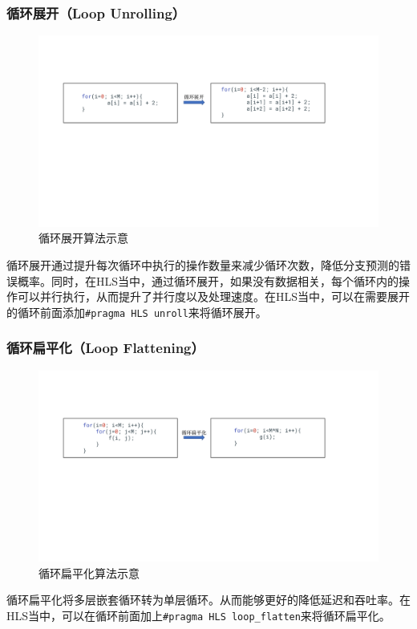 \subsubsection{循环展开（Loop Unrolling）}
\begin{figure}[htbp]
    \centering
    \includegraphics[width=\linewidth]{figures/loop unrolling.pdf}
    \caption{循环展开算法示意}
    \label{fig:loop_unrolling}
\end{figure}
循环展开通过提升每次循环中执行的操作数量来减少循环次数，降低分支预测的错误概率。同时，在HLS当中，通过循环展开，如果没有数据相关，每个循环内的操作可以并行执行，从而提升了并行度以及处理速度。在HLS当中，可以在需要展开的循环前面添加\verb|#pragma HLS unroll|来将循环展开。

\subsubsection{循环扁平化（Loop Flattening）}
\begin{figure}[htbp]
    \centering
    \includegraphics[width=\linewidth]{figures/loop flattening.pdf}
    \caption{循环扁平化算法示意}
    \label{fig:loop_flattening}
\end{figure}
循环扁平化将多层嵌套循环转为单层循环。从而能够更好的降低延迟和吞吐率。在HLS当中，可以在循环前面加上\verb|#pragma HLS loop_flatten|来将循环扁平化。
